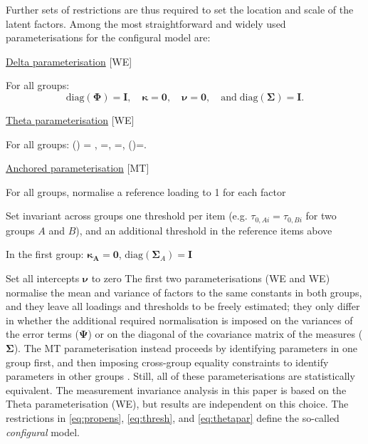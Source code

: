 Further sets of restrictions are thus required to set the location and scale of the latent factors. Among the most straightforward and widely used parameterisations for the configural model are:
\bi[label=$\diamond$]
\item \underline{Delta parameterisation} {[WE{\textDelta}]} \citep{Wu2016a}

For all groups: $$\text{diag}(\bm{\Phi}) = \bm{I}, \quad \bm{\kappa}=\bm{0}, \quad \bm{\nu}=\bm{0}, \quad \text{and} \; \text{diag}(\bm{\Sigma})=\bm{I}.$$

\item \underline{Theta parameterisation} {[WE{\textTheta}]} \citep{Wu2016a}

For all groups: 
\be\label{eq:thetapar}
(\bm{\Phi}) = , \quad \bm{\kappa}=, \quad \bm{\nu}=, \quad {} \; (\bm{\Psi})=.
\ee

\item \underline{Anchored parameterisation} {[MT]} \citep{Millsap2004}
  \bi
  \item For all groups, normalise a reference loading to 1 for each factor
  \item Set invariant across groups one threshold per item (e.g. $\tau_{0,Ai} = \tau_{0,Bi}$ for two groups $A$ and $B$), and an additional threshold in the reference items above
  \item In the first group: $\bm{\kappa_A}=\bm{0}$, $\text{diag}(\bm{\Sigma}_A)=\bm{I}$
  \item Set all intercepts $\bm{\nu}$ to zero
  \ei
\ei
The first two parameterisations (WE{\textDelta} and WE{\textTheta}) normalise the mean and variance of factors to the same constants in both groups, and they leave all loadings and thresholds to be freely estimated; they only differ in whether the additional required normalisation is imposed on the variances of the error terms ($\bm{\Psi}$) or on the diagonal of the covariance matrix of the measures ($\bm{\Sigma}$). The MT parameterisation instead proceeds by identifying parameters in one group first, and then imposing cross-group equality constraints to identify parameters in other groups \citep{Wu2016a}. Still, all of these parameterisations are statistically equivalent. The measurement invariance analysis in this paper is based on the Theta parameterisation (WE{\textTheta}), but results are independent on this choice. The restrictions in \eqref{eq:propens}, \eqref{eq:thresh}, and \eqref{eq:thetapar} define the so-called \emph{configural} model.

